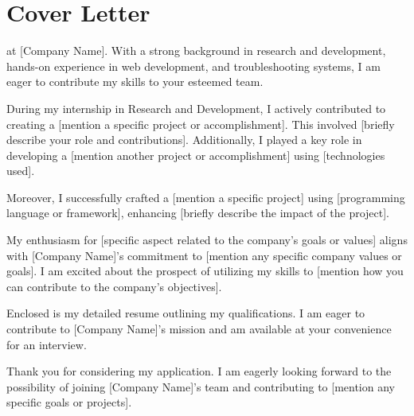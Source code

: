 \section{Cover Letter}

\lipsum[

I am writing to express my interest in the [Position Title] at [Company Name]. With a strong background in research and development, hands-on experience in web development, and troubleshooting systems, I am eager to contribute my skills to your esteemed team.

During my internship in Research and Development, I actively contributed to creating a [mention a specific project or accomplishment]. This involved [briefly describe your role and contributions]. Additionally, I played a key role in developing a [mention another project or accomplishment] using [technologies used].

Moreover, I successfully crafted a [mention a specific project] using [programming language or framework], enhancing [briefly describe the impact of the project].

My enthusiasm for [specific aspect related to the company's goals or values] aligns with [Company Name]'s commitment to [mention any specific company values or goals]. I am excited about the prospect of utilizing my skills to [mention how you can contribute to the company's objectives].

Enclosed is my detailed resume outlining my qualifications. I am eager to contribute to [Company Name]'s mission and am available at your convenience for an interview.

Thank you for considering my application. I am eagerly looking forward to the possibility of joining [Company Name]'s team and contributing to [mention any specific goals or projects].


\par
